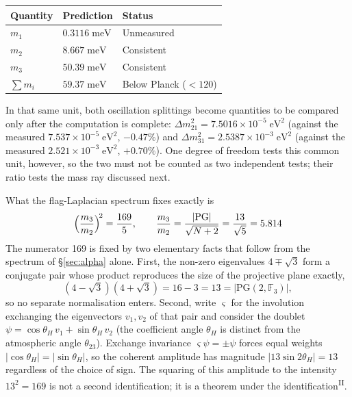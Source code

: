 \documentclass[12pt,a4paper]{article}
\newcommand{\PII}{\textsuperscript{\textup{II}}}
\begin{document}
\begin{center}\small
\begin{tabular}{lll}
\toprule
Quantity & Prediction & Status \\
\midrule
$m_1$ & $0.3116\;\mathrm{meV}$ & Unmeasured \\
$m_2$ & $8.667\;\mathrm{meV}$  & Consistent \\
$m_3$ & $50.39\;\mathrm{meV}$ & Consistent \\
$\sum m_i$ & $59.37\;\mathrm{meV}$ & Below Planck ($<120$) \\
\bottomrule
\end{tabular}
\end{center}

In that same unit, both oscillation splittings become quantities to be compared only after the computation is complete: $\Delta m^2_{21} = 7.5016 \times 10^{-5}\;\mathrm{eV}^2$ (against the measured $7.537 \times 10^{-5}\;\mathrm{eV}^2$, $-0.47\%$) and $\Delta m^2_{31} = 2.5387 \times 10^{-3}\;\mathrm{eV}^2$ (against the measured $2.521 \times 10^{-3}\;\mathrm{eV}^2$, $+0.70\%$). One degree of freedom tests this common unit, however, so the two must not be counted as two independent tests; their ratio tests the mass ray discussed next.

What the flag-Laplacian spectrum fixes exactly is
\[\Bigl(\frac{m_3}{m_2}\Bigr)^{\!2} = \frac{169}{5},\qquad \frac{m_3}{m_2} = \frac{|\mathrm{PG}|}{\sqrt{N+2}} = \frac{13}{\sqrt{5}} = 5.814\]
The numerator 169 is fixed by two elementary facts that follow from the spectrum of \S\ref{sec:alpha} alone. First, the non-zero eigenvalues $4\mp\sqrt3$ form a conjugate pair whose product reproduces the size of the projective plane exactly,
\begin{equation}
(4-\sqrt3)(4+\sqrt3) = 16 - 3 = 13 = |\mathrm{PG}(2,\mathbb F_3)| ,
\end{equation}
so no separate normalisation enters. Second, write $\varsigma$ for the involution exchanging the eigenvectors $v_{1},v_{2}$ of that pair and consider the doublet $\psi = \cos\theta_H\,v_1 + \sin\theta_H\,v_2$ (the coefficient angle $\theta_H$ is distinct from the atmospheric angle $\theta_{23}$). Exchange invariance $\varsigma\psi = \pm\psi$ forces equal weights $|\cos\theta_H| = |\sin\theta_H|$, so the coherent amplitude has magnitude $|13\sin 2\theta_H| = 13$ regardless of the choice of sign. The squaring of this amplitude to the intensity $13^2 = 169$ is not a second identification; it is a theorem under the identification\PII{}.
\end{document}
